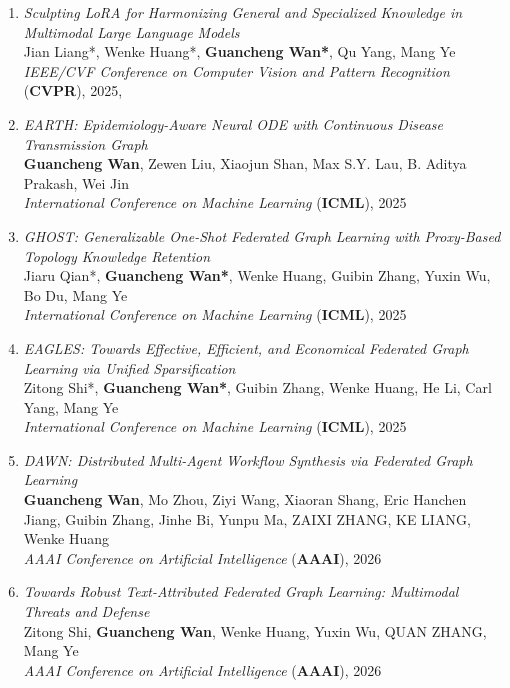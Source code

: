 \begin{enumerate}
    \item \textit{Sculpting LoRA for Harmonizing General and Specialized Knowledge in Multimodal Large Language Models} \\
    Jian Liang*, Wenke Huang*, \textbf{Guancheng Wan*}, Qu Yang, Mang Ye \\
    \hfill \textit{IEEE/CVF Conference on Computer Vision and Pattern Recognition} (\textbf{CVPR}), 2025, {}

    \item \textit{EARTH: Epidemiology-Aware Neural ODE with Continuous Disease Transmission Graph} \\
    \textbf{Guancheng Wan}, Zewen Liu, Xiaojun Shan, Max S.Y. Lau, B. Aditya Prakash, Wei Jin \\
    \hfill \textit{International Conference on Machine Learning} (\textbf{ICML}), 2025

    \item \textit{GHOST: Generalizable One-Shot Federated Graph Learning with Proxy-Based Topology Knowledge Retention} \\
    Jiaru Qian*, \textbf{Guancheng Wan*}, Wenke Huang, Guibin Zhang, Yuxin Wu, Bo Du, Mang Ye \\
    \hfill \textit{International Conference on Machine Learning} (\textbf{ICML}), 2025

    \item \textit{EAGLES: Towards Effective, Efficient, and Economical Federated Graph Learning via Unified Sparsification} \\
    Zitong Shi*, \textbf{Guancheng Wan*}, Guibin Zhang, Wenke Huang, He Li, Carl Yang, Mang Ye \\
    \hfill \textit{International Conference on Machine Learning} (\textbf{ICML}), 2025

    \item \textit{DAWN: Distributed Multi-Agent Workflow Synthesis via Federated Graph Learning} \\
    \textbf{Guancheng Wan}, Mo Zhou, Ziyi Wang, Xiaoran Shang, Eric Hanchen Jiang, Guibin Zhang, Jinhe Bi, Yunpu Ma, ZAIXI ZHANG, KE LIANG, Wenke Huang \\
    \hfill \textit{AAAI Conference on Artificial Intelligence} (\textbf{AAAI}), 2026

    \item \textit{Towards Robust Text-Attributed Federated Graph Learning: Multimodal Threats and Defense} \\
    Zitong Shi, \textbf{Guancheng Wan}, Wenke Huang, Yuxin Wu, QUAN ZHANG, Mang Ye \\
    \hfill \textit{AAAI Conference on Artificial Intelligence} (\textbf{AAAI}), 2026


\end{enumerate}
